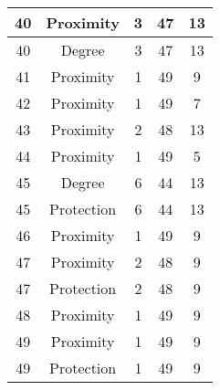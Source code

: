 \documentclass[results.tex]{subfiles}
\begin{document}
\begin{center}
\begin{tabular}{| c || c | c | c | c |}
            \hline
            40                      & Proximity                    & 3                      & 47                      & 13                   \\
            \hline
            40                      & Degree                       & 3                      & 47                      & 13                   \\
            \hline
            41                      & Proximity                    & 1                      & 49                      & 9                    \\
            \hline
            42                      & Proximity                    & 1                      & 49                      & 7                    \\
            \hline
            43                      & Proximity                    & 2                      & 48                      & 13                   \\
            \hline
            44                      & Proximity                    & 1                      & 49                      & 5                    \\
            \hline
            45                      & Degree                       & 6                      & 44                      & 13                   \\
            \hline
            45                      & Protection                   & 6                      & 44                      & 13                   \\
            \hline
            46                      & Proximity                    & 1                      & 49                      & 9                    \\
            \hline
            47                      & Proximity                    & 2                      & 48                      & 9                    \\
            \hline
            47                      & Protection                   & 2                      & 48                      & 9                    \\
            \hline
            48                      & Proximity                    & 1                      & 49                      & 9                    \\
            \hline
            49                      & Proximity                    & 1                      & 49                      & 9                    \\
            \hline
            49                      & Protection                   & 1                      & 49                      & 9                    \\
            \hline
        \end{tabular}
    \end{center}
\end{document}

